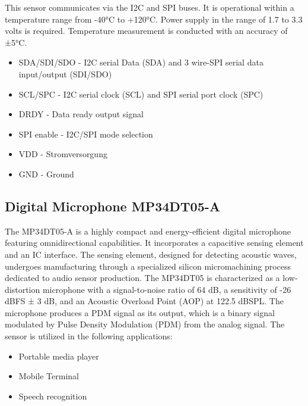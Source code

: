 This sensor communicates via the I2C and SPI buses. It is operational within a temperature range from -40°C to +120°C. Power supply in the range of 1.7 to 3.3 volts is required. Temperature measurement is conducted with an accuracy of ±5°C.

\begin{itemize}
	\item SDA/SDI/SDO - I2C serial Data (SDA) and 3 wire-SPI serial data input/output
	(SDI/SDO)
	\item  SCL/SPC - I2C serial clock (SCL) and SPI serial port clock (SPC)
	\item DRDY - Data ready output signal
	\item SPI enable - I2C/SPI mode selection
	\item VDD - Stromversorgung
	\item GND - Ground
\end{itemize}

\subsection{Digital Microphone MP34DT05-A}

The MP34DT05-A is a highly compact and energy-efficient digital microphone featuring omnidirectional capabilities. It incorporates a capacitive sensing element and an IC interface. The sensing element, designed for detecting acoustic waves, undergoes manufacturing through a specialized silicon micromachining process dedicated to audio sensor production. The MP34DT05 is characterized as a low-distortion microphone with a signal-to-noise ratio of 64 dB, a sensitivity of -26 dBFS ± 3 dB, and an Acoustic Overload Point (AOP) at 122.5 dBSPL. The microphone produces a PDM signal as its output, which is a binary signal modulated by Pulse Density Modulation (PDM) from the analog signal\cite{MP34DT06J:2021}. The sensor is utilized in the following applications:

\begin{itemize}
	\item Portable media player
	\item Mobile Terminal
	\item Speech recognition
\end{itemize}

